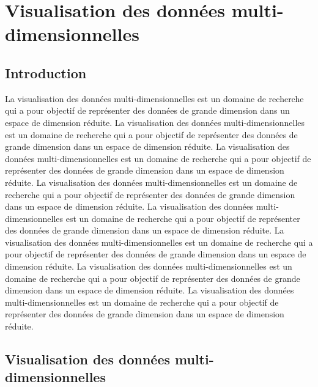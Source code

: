 \section{Visualisation des données multi-dimensionnelles}
\label{sec:visualisation_des_donnees_multi_dimensionnelles}
\subsection{Introduction}
\label{subsec:introduction}
La visualisation des données multi-dimensionnelles est un domaine de recherche qui a pour objectif de représenter des données de grande dimension dans un espace de dimension réduite. La visualisation des données multi-dimensionnelles est un domaine de recherche qui a pour objectif de représenter des données de grande dimension dans un espace de dimension réduite. La visualisation des données multi-dimensionnelles est un domaine de recherche qui a pour objectif de représenter des données de grande dimension dans un espace de dimension réduite. La visualisation des données multi-dimensionnelles est un domaine de recherche qui a pour objectif de représenter des données de grande dimension dans un espace de dimension réduite. La visualisation des données multi-dimensionnelles est un domaine de recherche qui a pour objectif de représenter des données de grande dimension dans un espace de dimension réduite. La visualisation des données multi-dimensionnelles est un domaine de recherche qui a pour objectif de représenter des données de grande dimension dans un espace de dimension réduite. La visualisation des données multi-dimensionnelles est un domaine de recherche qui a pour objectif de représenter des données de grande dimension dans un espace de dimension réduite. La visualisation des données multi-dimensionnelles est un domaine de recherche qui a pour objectif de représenter des données de grande dimension dans un espace de dimension réduite.
\subsection{Visualisation des données multi-dimensionnelles}
\label{subsec:visualisation_des_donnees_multi_dimensionnelles}

